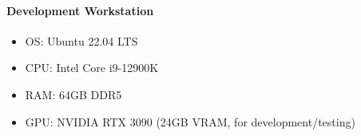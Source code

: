 \paragraph{Development Workstation}
\begin{itemize}
    \item OS: Ubuntu 22.04 LTS
    \item CPU: Intel Core i9-12900K
    \item RAM: 64GB DDR5
    \item GPU: NVIDIA RTX 3090 (24GB VRAM, for development/testing)
\end{itemize}
